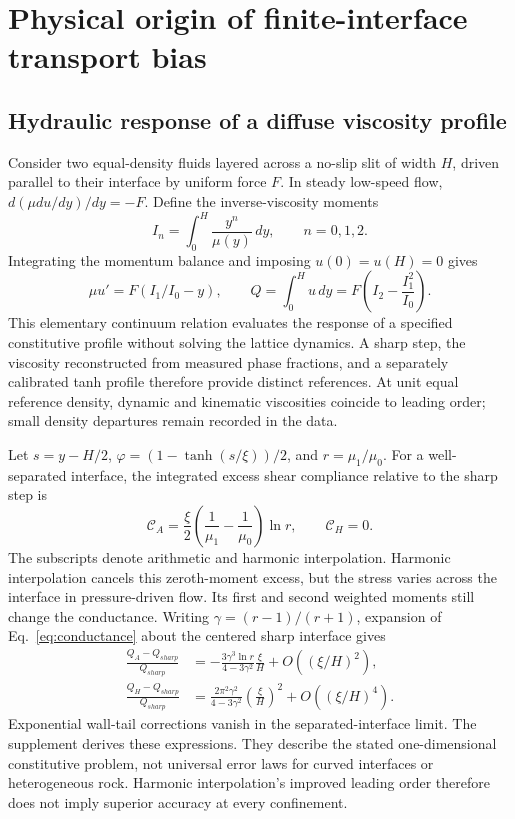 \section{Physical origin of finite-interface transport bias}
\subsection{Hydraulic response of a diffuse viscosity profile}
Consider two equal-density fluids layered across a no-slip slit of width $H$,
driven parallel to their interface by uniform force $F$. In steady low-speed
flow, $d(\mu du/dy)/dy=-F$. Define the inverse-viscosity moments
\begin{equation}
 I_n=\int_0^H\frac{y^n}{\mu(y)}\,dy,\qquad n=0,1,2.
\end{equation}
Integrating the momentum balance and imposing $u(0)=u(H)=0$ gives
\begin{equation}
 \mu u'=F(I_1/I_0-y),\qquad
 Q=\int_0^H u\,dy=F\left(I_2-\frac{I_1^2}{I_0}\right).
 \label{eq:conductance}
\end{equation}
This elementary continuum relation evaluates the response of a specified
constitutive profile without solving the lattice dynamics. A sharp step,
the viscosity reconstructed from measured phase fractions, and a separately
calibrated tanh profile therefore provide distinct references. At unit
equal reference density, dynamic and kinematic viscosities coincide to
leading order; small density departures remain recorded in the data.

Let $s=y-H/2$, $\varphi=(1-\tanh(s/\xi))/2$, and
$r=\mu_1/\mu_0$. For a well-separated interface, the integrated excess shear
compliance relative to the sharp step is
\begin{equation}
 \mathcal C_A=\frac{\xi}{2}\left(\frac1{\mu_1}-\frac1{\mu_0}\right)\ln r,
 \qquad \mathcal C_H=0.
\end{equation}
The subscripts denote arithmetic and harmonic interpolation. Harmonic
interpolation cancels this zeroth-moment excess, but the stress varies across
the interface in pressure-driven flow. Its first and second weighted moments
still change the conductance. Writing $\gamma=(r-1)/(r+1)$, expansion of
Eq.~\ref{eq:conductance} about the centered sharp interface gives
\begin{align}
 \frac{Q_A-Q_{sharp}}{Q_{sharp}}&=
 -\frac{3\gamma^3\ln r}{4-3\gamma^2}\frac{\xi}{H}
 +O((\xi/H)^2),\\
 \frac{Q_H-Q_{sharp}}{Q_{sharp}}&=
 \frac{2\pi^2\gamma^2}{4-3\gamma^2}\left(\frac{\xi}{H}\right)^2
 +O((\xi/H)^4).
 \label{eq:thininterface}
\end{align}
Exponential wall-tail corrections vanish in the separated-interface limit.
The supplement derives these expressions. They describe the stated
one-dimensional constitutive problem, not universal error laws for curved
interfaces or heterogeneous rock. Harmonic interpolation's improved leading
order therefore does not imply superior accuracy at every confinement.

